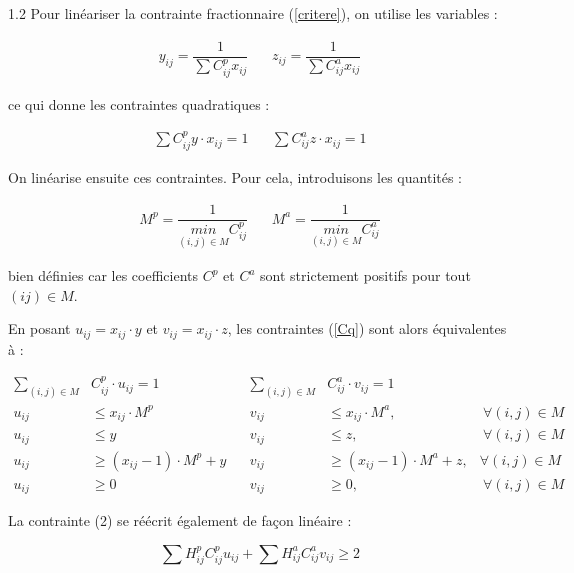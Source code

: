\documentclass[12pt,a4paper]{article}
\begin{document}
\vspace{0.5cm}

1.2 Pour linéariser la contrainte fractionnaire (\ref{critere}), on utilise les variables :

\begin{align*}
y_{ij}=\dfrac{1}{\sum C_{ij}^p x_{ij}} \ \ & \ \  z_{ij} =\dfrac{1}{\sum C_{ij}^a x_{ij}}
\end{align*}

ce qui donne les contraintes quadratiques :

\begin{align} \label{Cq}
 \sum C_{ij}^p y \cdot x_{ij} = 1 \ \ & \ \   \sum C_{ij}^a z \cdot x_{ij} = 1
\end{align}

On linéarise ensuite ces contraintes. Pour cela, introduisons les quantités :

\begin{align*}
M^{p} = \dfrac{1}{\underset{(i,j) \in M }{min} C_{ij}^p} \ \ & \ \ M^{a} = \dfrac{1}{\underset{(i,j) \in M }{min} C_{ij}^a} 
\end{align*}

bien définies car les coefficients $C^p $ et $C^a$ sont strictement positifs pour tout $(ij) \in M$.

En posant $u_{ij} = x_{ij} \cdot y$ et $v_{ij} = x_{ij} \cdot z$, les contraintes (\ref{Cq}) sont alors équivalentes à :

\begin{align} \label{Clin1}
\sum_{(i,j) \in M} & C^p_{ij}\cdot u_{ij} =1 \ \ & \ \ \sum_{(i,j) \in M} & C^a_{ij}\cdot v_{ij} =1 \  & \\
\label{Clin2} u_{ij} & \leq x_{ij} \cdot M^p \ \ & \ \  v_{ij} &\leq x_{ij} \cdot M^a, &\ \forall (i,j) \in M  \\
\label{Clin3} u_{ij} & \leq y  \ \ & \ \  v_{ij} & \leq z, &\ \forall (i,j) \in M  \\
\label{Clin4} u_{ij} & \geq (x_{ij}-1) \cdot M^p +y\ \ & \ \ v_{ij} & \geq (x_{ij}-1) \cdot M^a +z, & \forall (i,j) \in M \\
\label{Clin5} u_{ij} & \geq 0 \ \ & \ \  v_{ij} & \geq 0, &\ \forall (i,j) \in M  
\end{align}

La contrainte (2) se réécrit également de façon linéaire :

\begin{equation} \label{critereLin}
\sum H_{ij}^p C_{ij}^p u_{ij} + \sum H_{ij}^aC_{ij}^a v_{ij} \geq 2
\end{equation}
\end{document}
